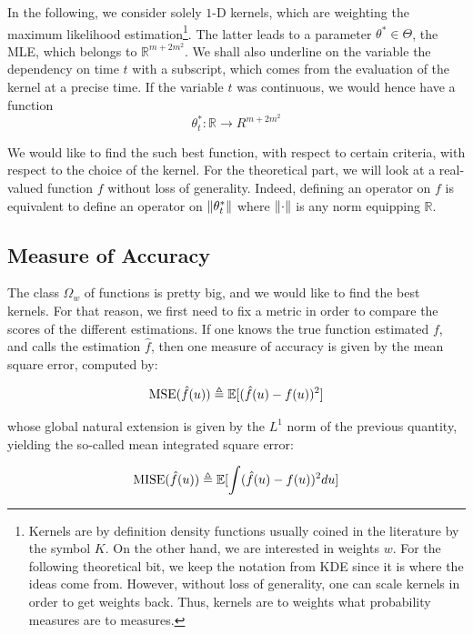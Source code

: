 In the following, we consider solely $1$-D kernels, which are weighting the maximum likelihood estimation\footnote{Kernels are by definition density functions usually coined in the literature by the symbol $K$. On the other hand, we are interested in weights $w$. For the following theoretical bit, we keep the notation from KDE since it is where the ideas come from. However, without loss of generality, one can scale kernels in order to get weights back. Thus, kernels are to weights what probability measures are to measures\label{section:diff_kernel_weights}.}. The latter leads to a parameter $\theta^* \in \Theta$, the MLE, which belongs to $\mathbb R^{m+2 m^2}$. We shall also underline on the variable the dependency on time $t$ with a subscript, which comes from the evaluation of the kernel at a precise time. If the variable $t$ was continuous, we would hence have a function $$\theta^*_t \colon \mathbb R  \to R^{m+2 m^2} $$

We would like to find the such best function, with respect to certain criteria, with respect to the choice of the kernel. For the theoretical part, we will look at a real-valued function $f$ without loss of generality. Indeed, defining an operator on $f$ is equivalent to define an operator on $\lVert \theta^*_t\rVert$ where $\lVert \cdot\rVert$ is any norm equipping $\mathbb R$.
\label{section:multi_to_uni}
\label{section:kernel_to_weights}






\subsection{Measure of Accuracy}
The class $ \Omega_w $ of functions is pretty big, and we would like to find the best kernels. For that reason, we first need to fix a metric in order to compare the scores of the different estimations. If one knows the true function estimated $f$, and calls the estimation $\hat{f}$, then one measure of accuracy is given by the mean square error, computed by: 

\begin{equation}
\operatorname{MSE} ( \hat{f}(u) ) \triangleq  \mathbb E [ ( \hat{f}(u) - f(u) )^2 ]
\end{equation}

whose global natural extension is given by the $L^1$ norm of the previous quantity, yielding the so-called mean integrated square error:

\begin{equation}
\operatorname{MISE} ( \hat{f}(u) ) \triangleq  \mathbb E [ \int ( \hat{f}(u) - f(u) )^2 du ]
\end{equation}


